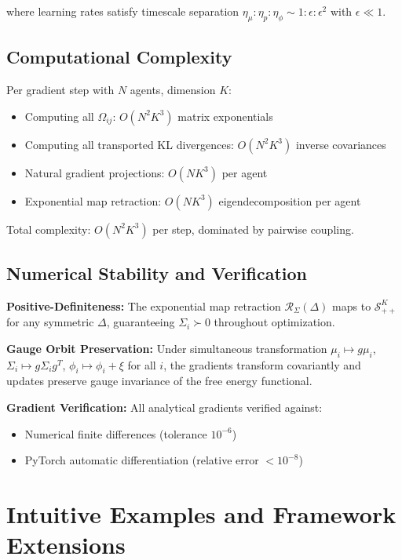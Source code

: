 \documentclass[11pt]{article}
\begin{document}
where learning rates satisfy timescale separation $\eta_\mu : \eta_p : \eta_\phi \sim 1 : \epsilon : \epsilon^2$ with $\epsilon \ll 1$.

\subsection*{Computational Complexity}

Per gradient step with $N$ agents, dimension $K$:
\begin{itemize}
\item Computing all $\Omega_{ij}$: $O(N^2 K^3)$ matrix exponentials
\item Computing all transported KL divergences: $O(N^2 K^3)$ inverse covariances
\item Natural gradient projections: $O(NK^3)$ per agent
\item Exponential map retraction: $O(NK^3)$ eigendecomposition per agent
\end{itemize}

Total complexity: $O(N^2 K^3)$ per step, dominated by pairwise coupling.

\subsection*{Numerical Stability and Verification}

\textbf{Positive-Definiteness:} The exponential map retraction $\mathcal{R}_{\Sigma}(\Delta)$ maps to $\mathcal{S}_{++}^K$ for any symmetric $\Delta$, guaranteeing $\Sigma_i \succ 0$ throughout optimization.

\textbf{Gauge Orbit Preservation:} Under simultaneous transformation $\mu_i \mapsto g\mu_i$, $\Sigma_i \mapsto g\Sigma_i g^T$, $\phi_i \mapsto \phi_i + \xi$ for all $i$, the gradients transform covariantly and updates preserve gauge invariance of the free energy functional.

\textbf{Gradient Verification:} All analytical gradients verified against:
\begin{itemize}
\item Numerical finite differences (tolerance $10^{-6}$)
\item PyTorch automatic differentiation (relative error $< 10^{-8}$)
\end{itemize}







\section{Intuitive Examples and Framework Extensions}
\label{app:examples}
\end{document}
